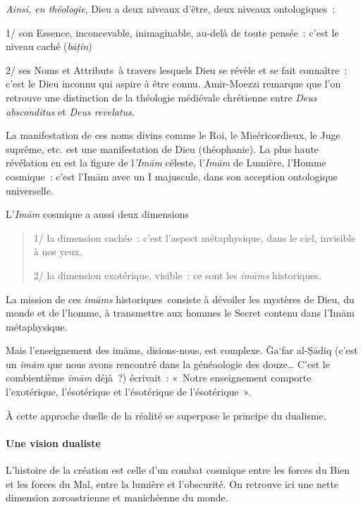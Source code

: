 \emph{Ainsi, en théologie}, Dieu a deux niveaux d'être, deux niveaux
ontologiques~:

1/ son Essence, inconcevable, inimaginable, au-delà de toute pensée~:
c'est le niveau caché (\emph{bāṭin})

2/ ses Noms et Attributs~à travers lesquels Dieu se révèle et se fait
connaître~: c'est le Dieu inconnu qui aspire à être connu. Amir-Moezzi
remarque que l'on retrouve une distinction de la théologie médiévale
chrétienne entre \emph{Deus absconditus} et \emph{Deus revelatus}.

La manifestation de ces noms divins comme le Roi, le Miséricordieux, le
Juge suprême, etc. est une manifestation de Dieu (théophanie). La plus
haute révélation en est la figure de l\emph{'Imām} céleste,
l'\emph{Imām} de Lumière, l'Homme cosmique~: c'est l'Imām avec un I
majuscule, dans son acception ontologique universelle.

L'\emph{Imām} cosmique a aussi deux dimensions

\begin{quote}
1/ la dimension cachée~: c'est l'aspect métaphysique, dans le ciel,
invisible à nos yeux.

2/ la dimension exotérique, visible~: ce sont les \emph{imāms}
historiques.
\end{quote}

La mission de ces \emph{imāms} historiques~consiste à dévoiler les
mystères de Dieu, du monde et de l'homme, à transmettre aux hommes le
Secret contenu dans l'Imām métaphysique.

Mais l'enseignement des imāms, disions-nous, est complexe. Ǧa`far
al-Ṣādiq (c'est un \emph{imām} que nous avons rencontré dans la
généaologie des douze\ldots{} C'est le combientième \emph{imām} déjà~?)
écrivait~: «~Notre enseignement comporte l'exotérique, l'ésotérique et
l'ésotérique de l'ésotérique~».

À cette approche duelle de la réalité se superpose le principe du
dualisme.

 
\paragraph{ Une vision dualiste}\label{une-vision-dualiste}
L'histoire de la création est celle d'un combat cosmique entre les
forces du Bien et les forces du Mal, entre la lumière et l'obscurité. On
retrouve ici une nette dimension zoroastrienne et manichéenne du monde.

